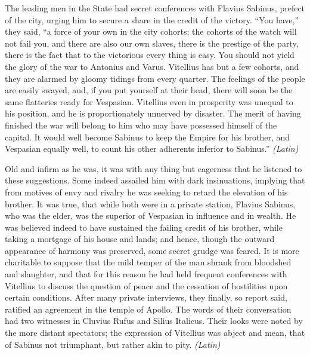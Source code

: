 
The leading men in the State had secret conferences with Flavius Sabinus, prefect of the city, urging him to secure a share in the credit of the victory. ``You have,'' they said, ``a force of your own in the city cohorts; the cohorts of the watch will not fail you, and there are also our own slaves, there is the prestige of the party, there is the fact that to the victorious every thing is easy. You should not yield the glory of the war to Antonius and Varus. Vitellius has but a few cohorts, and they are alarmed by gloomy tidings from every quarter. The feelings of the people are easily swayed, and, if you put yourself at their head, there will soon be the same flatteries ready for Vespasian. Vitellius even in prosperity was unequal to his position, and he is proportionately unnerved by disaster. The merit of having finished the war will belong to him who may have possessed himself of the capital. It would well become Sabinus to keep the Empire for his brother, and Vespasian equally well, to count his other adherents inferior to Sabinus.'' \emph{(Latin)}


Old and infirm as he was, it was with any thing but eagerness that he listened to these suggestions. Some indeed assailed him with dark insinuations, implying that from motives of envy and rivalry he was seeking to retard the elevation of his brother. It was true, that while both were in a private station, Flavius Sabinus, who was the elder, was the superior of Vespasian in influence and in wealth. He was believed indeed to have sustained the failing credit of his brother, while taking a mortgage of his house and lands; and hence, though the outward appearance of harmony was preserved, some secret grudge was feared. It is more charitable to suppose that the mild temper of the man shrank from bloodshed and slaughter, and that for this reason he had held frequent conferences with Vitellius to discuss the question of peace and the cessation of hostilities upon certain conditions. After many private interviews, they finally, so report said, ratified an agreement in the temple of Apollo. The words of their conversation had two witnesses in Cluvius Rufus and Silius Italicus. Their looks were noted by the more distant spectators; the expression of Vitellius was abject and mean, that of Sabinus not triumphant, but rather akin to pity. \emph{(Latin)}


